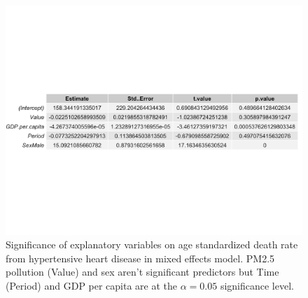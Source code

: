 \documentclass[12pt, letterpaper, twoside]{article}\usepackage[]{graphicx}\usepackage[]{xcolor}
\begin{document}
\begin{figure}[t]
\includegraphics[scale=0.5]{hyper.chart.pdf}
  \centering
  \caption{Significance of explanatory variables on age standardized death rate
  from hypertensive heart disease in mixed effects model. PM2.5 pollution (Value)
  and sex aren't significant predictors but Time (Period) and GDP per capita are
  at the \begin{math}\alpha = 0.05\end{math} significance level.}
\end{figure}
\end{document}
